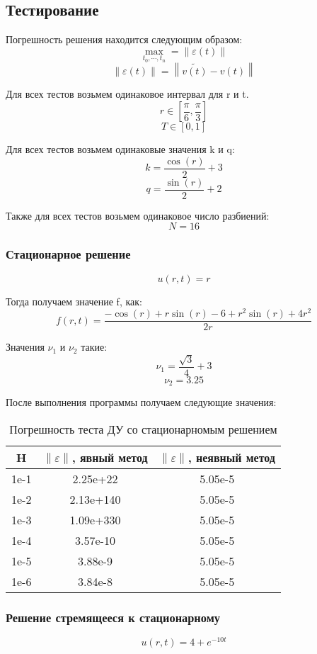 \subsection{Тестирование}

Погрешность решения находится следующим образом:
\[
  \max_{t_0, \cdots, t_n} = \left\lVert \varepsilon(t) \right\rVert 
\]
\[
  \left\lVert \varepsilon(t) \right\rVert  = \left\lVert \tilde{v(t)} - v(t) \right\rVert 
\]

Для всех тестов возьмем одинаковое интервал для r и t.
\[
  r \in [\frac{\pi}{6}, \frac{\pi}{3}]
\]
\[
  T \in [0, 1]
\]

Для всех тестов возьмем одинаковые значения k и q:
\[
  k = \frac{\cos(r)}{2} + 3
\]
\[
  q = \frac{\sin(r)}{2} + 2
\]

Также для всех тестов возьмем одинаковое число разбиений:
\[
  N = 16
\]

\subsubsection{Стационарное решение}
\[
  u(r, t) = r
\]

Тогда получаем значение f, как:
\[
  f(r, t) = \frac{-\cos(r) + r \sin(r)-6 + r^2 \sin(r) + 4r^2}{2r}
\]

Значения $ \nu_1 $ и $ \nu_2 $ такие:
\[
  \nu_1 = \frac{\sqrt{3}}{4} + 3
\]
\[
  \nu_2 = 3.25
\]

После выполнения программы получаем следующие значения:
\begin{table}[H]
  \centering
  \begin{tabular}{c | c | c}
    \toprule
    H & $ \left\lVert \varepsilon \right\rVert  $, явный метод & $ \left\lVert \varepsilon \right\rVert  $, неявный метод \\
    \midrule
    1e-1 & 2.25e+22 & 5.05e-5\\
    1e-2 & 2.13e+140 & 5.05e-5\\
    1e-3 & 1.09e+330 & 5.05e-5\\
    1e-4 & 3.57e-10 & 5.05e-5\\
    1e-5 & 3.88e-9 & 5.05e-5\\
    1e-6 & 3.84e-8 & 5.05e-5\\
    \bottomrule
  \end{tabular}
  \caption{Погрешность теста ДУ со стационарномым решением}
\end{table}

\subsubsection{Решение стремящееся к стационарному}
\[
  u(r, t) = 4 + e^{-10t}
\]

